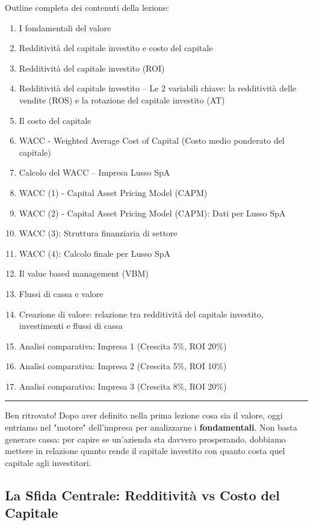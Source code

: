 \documentclass[a4paper,10pt]{article}
\begin{document}
Outline completa dei contenuti della lezione:
{\small
\begin{enumerate}
\item I fondamentali del valore
\item Redditività del capitale investito e costo del capitale
\item Redditività del capitale investito (ROI)
\item Redditività del capitale investito – Le 2 variabili chiave: la redditività delle vendite (ROS) e la rotazione del capitale investito (AT)
\item Il costo del capitale
\item WACC - Weighted Average Cost of Capital (Costo medio ponderato del capitale)
\item Calcolo del WACC – Impresa Lusso SpA
\item WACC (1) - Capital Asset Pricing Model (CAPM)
\item WACC (2) - Capital Asset Pricing Model (CAPM): Dati per Lusso SpA
\item WACC (3): Struttura finanziaria di settore
\item WACC (4): Calcolo finale per Lusso SpA
\item Il value based management (VBM)
\item Flussi di cassa e valore
\item Creazione di valore: relazione tra redditività del capitale investito, investimenti e flussi di cassa
\item Analisi comparativa: Impresa 1 (Crescita 5\%, ROI 20\%)
\item Analisi comparativa: Impresa 2 (Crescita 5\%, ROI 10\%)
\item Analisi comparativa: Impresa 3 (Crescita 8\%, ROI 20\%)
\end{enumerate}
}
\hrule
\vspace{0.5cm}

Ben ritrovato! Dopo aver definito nella prima lezione cosa sia il valore, oggi entriamo nel "motore" dell'impresa per analizzarne i \textbf{fondamentali}. Non basta generare cassa: per capire se un'azienda sta davvero prosperando, dobbiamo mettere in relazione quanto rende il capitale investito con quanto costa quel capitale agli investitori.

\subsection*{La Sfida Centrale: Redditività vs Costo del Capitale}
\end{document}
